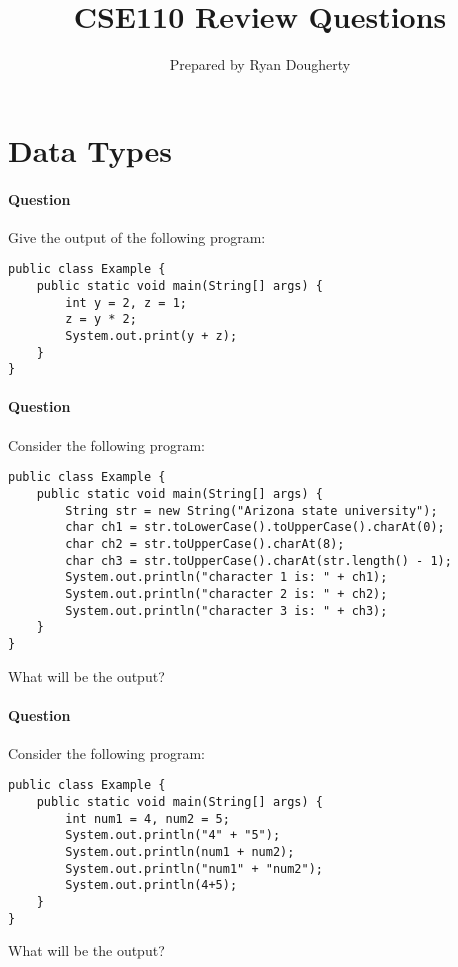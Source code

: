 \documentclass{article}
\title{CSE110 Review Questions}
\author{Prepared by Ryan Dougherty}
\date{}
\begin{document}
\maketitle

\setcounter{question_num}{1}

\section*{Data Types}

\setcounter{question_num}{1}
\paragraph{Question }
Give the output of the following program:
\begin{lstlisting}
public class Example {
	public static void main(String[] args) {
		int y = 2, z = 1;
		z = y * 2;
		System.out.print(y + z);
	}
}
\end{lstlisting}

\addtocounter{question_num}{1}
\paragraph{Question }
Consider the following program:
\begin{lstlisting}
public class Example {
	public static void main(String[] args) {
		String str = new String("Arizona state university");
		char ch1 = str.toLowerCase().toUpperCase().charAt(0);
		char ch2 = str.toUpperCase().charAt(8);
		char ch3 = str.toUpperCase().charAt(str.length() - 1);
		System.out.println("character 1 is: " + ch1);
		System.out.println("character 2 is: " + ch2);
		System.out.println("character 3 is: " + ch3);
	}
}
\end{lstlisting}
What will be the output?

\addtocounter{question_num}{1}
\paragraph{Question }
Consider the following program:
\begin{lstlisting}
public class Example {
	public static void main(String[] args) {
		int num1 = 4, num2 = 5;
		System.out.println("4" + "5");
		System.out.println(num1 + num2);
		System.out.println("num1" + "num2");
		System.out.println(4+5);
	}
}
\end{lstlisting}
What will be the output?
\end{document}
